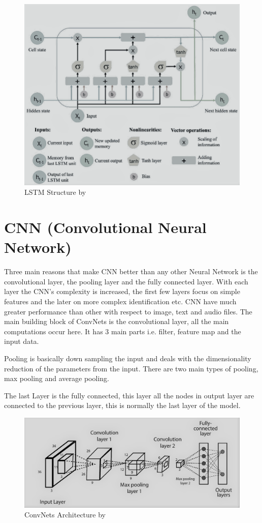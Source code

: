 \documentclass[oneside,12pt]{Classes/RoboticsLaTeX}
\begin{document}
\begin{figure}[H]
  \centering
  \includegraphics[width=0.90\linewidth]{Figures/lstm.png}
  \caption{LSTM Structure by \cite{yan}}
  \label{fig:lstm}
\end{figure}

\section{CNN (Convolutional Neural Network)}

Three main reasons that make CNN better than any other Neural Network is  the convolutional layer, the pooling layer and the fully connected layer. With each layer the CNN's complexity is increased, the first few layers focus on simple features and the later on more complex identification etc. CNN have much greater performance than other with respect to image, text and audio files. The main building block of ConvNets is the convolutional layer, all the main computations occur here. It  has 3 main parts i.e. filter, feature map and the input data. \cite{ibm}

Pooling is basically down sampling the input and deals with the dimensionality reduction of the parameters from the input. \cite{ibm} There are two main types of pooling, max pooling and average pooling.

The last Layer is the fully connected, this layer all the nodes in output layer are connected to the previous layer, this is normally the last layer of the model.

\begin{figure}[H]
  \centering
  \includegraphics[width=0.90\linewidth]{Figures/cnn.png}
  \caption{ConvNets Architecture by \cite{cnnfig}}
  \label{fig:cnn}
\end{figure}
\end{document}
